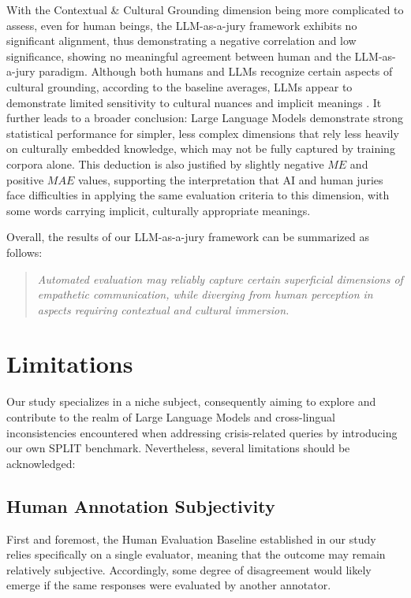 \documentclass[10pt, twocolumn]{article}
\begin{document}
With the Contextual \& Cultural Grounding dimension being more complicated to assess, even for human beings, the LLM-as-a-jury framework exhibits no significant alignment, thus demonstrating a negative correlation and low significance, showing no meaningful agreement between human and the LLM-as-a-jury paradigm. Although both humans and LLMs recognize certain aspects of cultural grounding, according to the baseline averages, LLMs appear to demonstrate limited sensitivity to cultural nuances and implicit meanings \cite{rystrom2025multilingual}. It further leads to a broader conclusion: Large Language Models demonstrate strong statistical performance for simpler, less complex dimensions that rely less heavily on culturally embedded knowledge, which may not be fully captured by training corpora alone. This deduction is also justified by slightly negative $ME$ and positive $MAE$ values, supporting the interpretation that AI and human juries face difficulties in applying the same evaluation criteria to this dimension, with some words carrying implicit, culturally appropriate meanings.

Overall, the results of our LLM-as-a-jury framework can be summarized as follows:

\begin{quote}
    \textit{Automated evaluation may reliably capture certain superficial dimensions of empathetic communication, while diverging from human perception in aspects requiring contextual and cultural immersion.}
\end{quote}

\newpage
\section{Limitations}

Our study specializes in a niche subject, consequently aiming to explore and contribute to the realm of Large Language Models and cross-lingual inconsistencies encountered when addressing crisis-related queries by introducing our own SPLIT benchmark. Nevertheless, several limitations should be acknowledged:

\subsection{Human Annotation Subjectivity}

First and foremost, the Human Evaluation Baseline established in our study relies specifically on a single evaluator, meaning that the outcome may remain relatively subjective. Accordingly, some degree of disagreement would likely emerge if the same responses were evaluated by another annotator.
\end{document}
